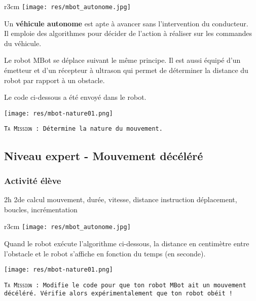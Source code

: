 \begin{wrapfigure}[6]{r}{3cm}
    \texttt{[image: res/mbot\_autonome.jpg]}
\end{wrapfigure}

\begin{eleve}
    
    Un \textbf{véhicule autonome} est apte à avancer sans l'intervention du conducteur.\\
    Il emploie des algorithmes pour décider de l'action à réaliser sur les commandes du véhicule.
    
    Le robot MBot se déplace suivant le même principe. Il est aussi équipé d'un émetteur et d'un récepteur à ultrason qui permet de déterminer la distance du robot par rapport à un obstacle.
    
    Le code ci-dessous a été envoyé dans le robot.
    \begin{center}
            \texttt{[image: res/mbot-nature01.png]}
    \end{center}
    
    \texttt{\textsc{Ta Mission} :
    Détermine la nature du mouvement.}
\end{eleve}


\newpage

\subsection{Niveau expert - Mouvement décéléré}

\subsubsection{Activité élève}

\cartouche
{2h}         %
{2de}         %
{calcul}        %
{mouvement, durée, vitesse, distance}     %
{instruction déplacement, boucles, incrémentation}       %


\begin{wrapfigure}[6]{r}{3cm}
    \texttt{[image: res/mbot\_autonome.jpg]}
\end{wrapfigure}

\begin{eleve}
    
    Quand le robot exécute l'algorithme ci-dessous, la distance en centimètre entre l'obstacle et le robot s'affiche en fonction du temps (en seconde).
    
    \begin{center}
            \texttt{[image: res/mbot-nature01.png]}
    \end{center}
    
    \texttt{\textsc{Ta Mission} : Modifie le code pour que ton robot MBot ait un mouvement décéléré. Vérifie alors expérimentalement que ton robot obéit !}
\end{eleve}


